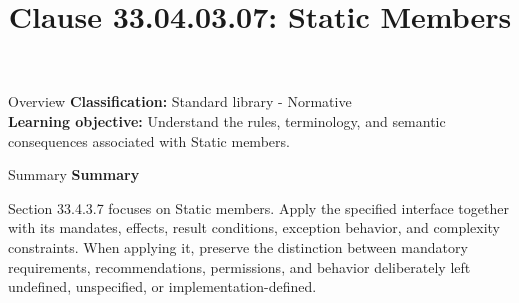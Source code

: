 \documentclass[10pt,letterpaper]{article}
\title{Clause 33.04.03.07: Static Members}
\author{}
\date{}
\begin{document}
\maketitle
\begin{CornellOverviewBox}{Overview}
\textbf{Classification:} Standard library - Normative\\[2pt]
\textbf{Learning objective:} Understand the rules, terminology, and semantic consequences associated with Static members.
\end{CornellOverviewBox}\begin{CornellSummaryBox}{Summary}
{\sffamily\bfseries\color{Accent} Summary}\par\vspace{3pt}Section 33.4.3.7 focuses on Static members. Apply the specified interface together with its mandates, effects, result conditions, exception behavior, and complexity constraints. When applying it, preserve the distinction between mandatory requirements, recommendations, permissions, and behavior deliberately left undefined, unspecified, or implementation-defined.
\end{CornellSummaryBox}
\end{document}
